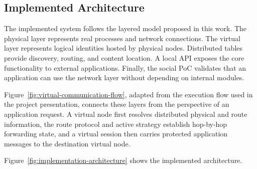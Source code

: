 \documentclass[12pt]{article}
\begin{document}
\subsection{Implemented Architecture}
\label{sec:implemented-architecture}

The implemented system follows the layered model proposed in this work. The physical layer represents real processes and network connections. The virtual layer represents logical identities hosted by physical nodes. Distributed tables provide discovery, routing, and content location. A local API exposes the core functionality to external applications. Finally, the social PoC validates that an application can use the network layer without depending on internal modules.

Figure~\ref{fig:virtual-communication-flow}, adapted from the execution flow used in the project presentation, connects these layers from the perspective of an application request. A virtual node first resolves distributed physical and route information, the route protocol and active strategy establish hop-by-hop forwarding state, and a virtual session then carries protected application messages to the destination virtual node.

\thesisvirtualcommunicationflowtikz

Figure~\ref{fig:implementation-architecture} shows the implemented architecture.
\end{document}
